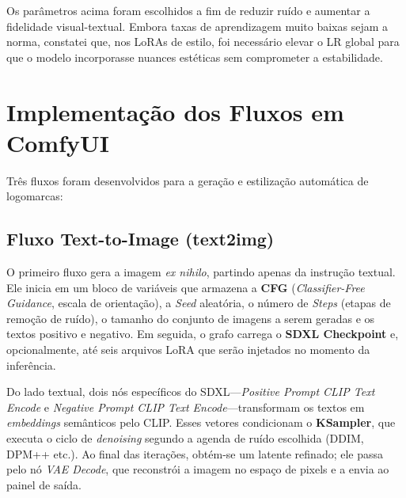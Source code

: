 \documentclass[12pt, %
openright, 
oneside, %
a4paper,    %
brazil]{facom-ufu-abntex2}
\begin{document}
Os parâmetros acima foram escolhidos a fim de reduzir ruído e aumentar a fidelidade visual-textual. Embora taxas de aprendizagem muito baixas sejam a norma, constatei que, nos LoRAs de estilo, foi necessário elevar o LR global para que o modelo incorporasse nuances estéticas sem comprometer a estabilidade.

\section{Implementação dos Fluxos em ComfyUI}

Três fluxos foram desenvolvidos para a geração e estilização automática de logomarcas:

\subsection{Fluxo Text-to-Image (text2img)}

O primeiro fluxo gera a imagem \emph{ex nihilo}, partindo apenas da instrução textual. Ele inicia em um bloco de variáveis que armazena a \textbf{CFG} (\emph{Classifier-Free Guidance}, escala de orientação), a \emph{Seed} aleatória, o número de \emph{Steps} (etapas de remoção de ruído), o tamanho do conjunto de imagens a serem geradas e os textos positivo e negativo. Em seguida, o grafo carrega o \textbf{SDXL Checkpoint} e, opcionalmente, até seis arquivos LoRA que serão injetados no momento da inferência.

Do lado textual, dois nós específicos do SDXL—\textit{Positive Prompt CLIP Text Encode} e \textit{Negative Prompt CLIP Text Encode}—transformam os textos em \emph{embeddings} semânticos pelo CLIP. Esses vetores condicionam o \textbf{KSampler}, que executa o ciclo de \emph{denoising} segundo a agenda de ruído escolhida (DDIM, DPM++ etc.). Ao final das iterações, obtém-se um latente refinado; ele passa pelo nó \textit{VAE Decode}, que reconstrói a imagem no espaço de pixels e a envia ao painel de saída.
\end{document}
